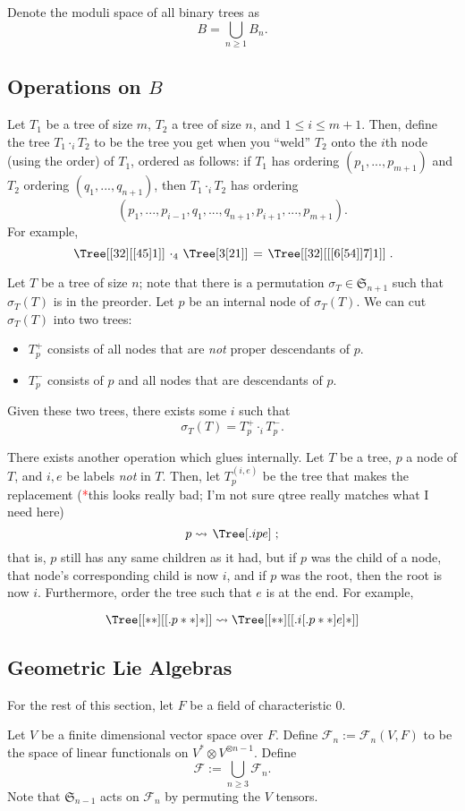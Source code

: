 \documentclass{article}
\newcommand{\Ff}{\mathcal{F}}
\newcommand{\tk}{\textcolor{red}{*}}
\newcommand{\Sym}{\mathfrak{S}}
\begin{document}
Denote the moduli space of all binary trees as
\[B=\bigcup_{n \ge 1}B_n. \]

\subsection{Operations on $B$}
Let $T_1$ be a tree of size $m$, $T_2$ a tree of size $n$, and $1 \le i \le m+1$.  Then, define the tree $T_1 \cdot_i T_2$ to be the tree you get when you ``weld'' $T_2$ onto the $i$th node (using the order) of $T_1$, ordered as follows: if $T_1$ has ordering $(p_1,...,p_{m+1})$ and $T_2$ ordering $(q_1,...,q_{n+1})$, then $T_1 \cdot_i T_2$ has ordering
\[(p_1,...,p_{i-1},q_1,...,q_{n+1},p_{i+1},...,p_{m+1}). \]
For example,
\[ \left. \Tree[ [ 3 2 ] [ [ 4 5 ]  1 ] ] \right.  \cdot_4  \left. \Tree[ 3 [ 2 1 ] ] \right. = \left. \Tree[ [ 3 2 ] [ [ [ 6 [ 5 4 ] ] 7 ]  1 ] ] \right..
\]

Let $T$ be a tree of size $n$; note that there is a permutation $\sigma_T \in \Sym_{n+1}$ such that $\sigma_T(T)$ is in the preorder.  Let $p$ be an internal node of $\sigma_T(T)$.  We can cut $\sigma_T(T)$ into two trees:
\begin{itemize}
\item $T_p^+$ consists of all nodes that are \textit{not} proper descendants of $p$.
\item $T_p^-$ consists of $p$ and all nodes that are descendants of $p$.
\end{itemize}
Given these two trees, there exists some $i$ such that
\[\sigma_T(T) = T_p^+ \cdot_i T_p^-. \]

There exists another operation which glues internally.  Let $T$ be a tree, $p$ a node of $T$, and $i,e$ be labels \textit{not} in $T$.  Then, let $T^{(i,e)}_p$ be the tree that makes the replacement (\tk this looks really bad; I'm not sure qtree really matches what I need here)
\[p \rightsquigarrow \left. \Tree [.i p e ] \right. ; \]
that is, $p$ still has any same children as it had, but if $p$ was the child of a node, that node's corresponding child is now $i$, and if $p$ was the root, then the root is now $i$.  Furthermore, order the tree such that $e$ is at the end.  For example,

\[\Tree [ [ * * ] [ [.p * * ] * ] ] \rightsquigarrow \Tree [ [ * * ] [ [.i [.p * * ] e ] * ] ] \]

\subsection{Geometric Lie Algebras}
For the rest of this section, let $F$ be a field of characteristic $0$.

Let $V$ be a finite dimensional vector space over $F$.  Define $\Ff_n:=\Ff_n(V,F)$ to be the space of linear functionals on $V^* \otimes V^{\otimes n-1}$.  Define
\[\Ff := \bigcup_{n \ge 3} \Ff_n. \]
Note that $\Sym_{n-1}$ acts on $\Ff_n$ by permuting the $V$ tensors.
\end{document}
